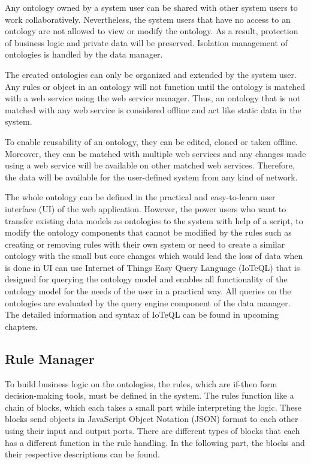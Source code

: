 Any ontology owned by a system user can be shared with other system users to work collaboratively. Nevertheless, the system users that have no access to an ontology are not allowed to view or modify the ontology. As a result, protection of business logic and private data will be preserved. Isolation management of ontologies is handled by the data manager. 

The created ontologies can only be organized and extended by the system user. Any rules or object in an ontology will not function until the ontology is matched with a web service using the web service manager. Thus, an ontology that is not matched with any web service is considered offline and act like static data in the system.

To enable reusability of an ontology, they can be edited, cloned or taken offline. Moreover, they can be matched with multiple web services and any changes made using a web service will be available on other matched web services. Therefore, the data will be available for the user-defined system from any kind of network.

The whole ontology can be defined in the practical and easy-to-learn user interface (UI) of the web application. However, the power users who want to transfer existing data models as ontologies to the system with help of a script, to modify the ontology components that cannot be modified by the rules such as creating or removing rules with their own system or need to create a similar ontology with the small but core changes which would lead the loss of data when is done in UI can use Internet of Things Easy Query Language (IoTeQL) that is designed for querying the ontology model and enables all functionality of the ontology model for the needs of the user in a practical way. All queries on the ontologies are evaluated by the query engine component of the data manager. The detailed information and syntax of IoTeQL can be found in upcoming chapters. %

\subsection{Rule Manager}
\label{ss:rule_manager}

To build business logic on the ontologies, the rules, which are if-then form decision-making tools, must be defined in the system. The rules function like a chain of blocks, which each takes a small part while interpreting the logic. These blocks send objects in JavaScript Object Notation (JSON) format to each other using their input and output ports. There are different types of blocks that each has a different function in the rule handling. In the following part, the blocks and their respective descriptions can be found.

